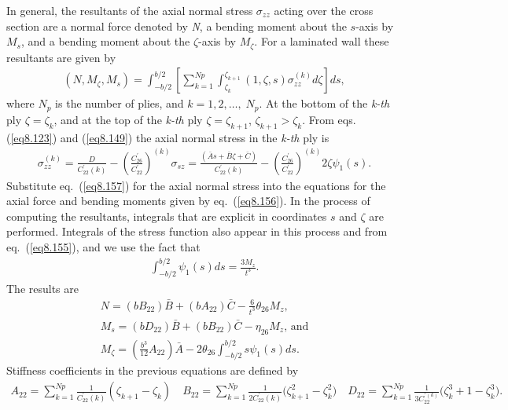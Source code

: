 \documentclass{AeroStructure-ERJohnson}
\begin{document}
In general, the resultants of the axial normal stress
$\sigma_{z z}$ acting over the cross section are a normal force
denoted by \textit{N}, a bending moment about the $s$-axis by
$M_{s}$, and a bending moment about the $\zeta$-axis by $M_{\zeta}$.
For a laminated wall these resultants are given by
\begin{align}\label{eq8.156}
\left(N, M_{\zeta}, M_{s}\right)=\int_{-b/ 2}^{b/
2}\left[\sum_{k=1}^{N p} \int^{\zeta_{k+1}}_{\zeta_{k}}(1, \zeta,
s) \sigma_{z z}^{(k)} d \zeta\right] d s,
\end{align}
where $N_{p}$ is the number of plies, and $k=1,2, \ldots,\; N_{p}$.
At the bottom of the \textit{k-th} ply $\zeta=\zeta_{k}$, and at
the top of the \textit{k-th} ply $\zeta=\zeta_{k+1}$,
$\zeta_{k+1}>\zeta_{k}$. From eqs. (\ref{eq8.123}) and
(\ref{eq8.149}) the axial normal stress in the \textit{k-th} ply
is
\begin{align}\label{eq8.157}
\sigma_{z
z}^{(k)}=\frac{D}{C_{22}^{\prime}(k)}-\left(\frac{C_{26}^{\prime}}{C_{22}^{\prime}}\right)^{(k)}
\sigma_{s z}=\frac{(\bar{A} s+\bar{B}
\zeta+\bar{C})}{C_{22}^{\prime}(k)}-\left(\frac{C_{26}^{\prime}}{C_{22}^{\prime}}\right)^{(k)}
2 \zeta \psi_{1}(s).
\end{align}
Substitute eq.~(\ref{eq8.157}) for the axial normal stress into
the equations for the axial force and bending moments given by
eq.~(\ref{eq8.156}). In the process of computing the resultants,
integrals that are explicit in coordinates $s$ and $\zeta$ are
performed. Integrals of the stress function also appear in this
process and from eq.~(\ref{eq8.155}), and we use the fact that
\begin{align*}
\int_{-b/ 2}^{b/ 2} \psi_{1}(s) d s=\frac{3 M_{z}}{t^{3}}.
\end{align*}
The results are
\begin{gather}
N=\left(b B_{22}\right) \bar{B}+\left(b A_{22}\right)
\bar{C}-\frac{6}{t^{3}} \theta_{26} M_{z},\label{eq8.158}\\
M_{s}=\left(b D_{22}\right) \bar{B}+\left(b B_{22}\right)
\bar{C}-\eta_{26} M_{z}\mbox{, and}\label{eq8.159}\\
M_{\zeta}=\left(\frac{b^{3}}{12} A_{22}\right) \bar{A}-2
\theta_{26} \int_{-b/ 2}^{b/ 2} s \psi_{1}(s) d s.\label{eq8.160}
\end{gather}
Stiffness coefficients in the previous equations are defined by
\begin{align}\label{eq8.161}
A_{22}=\sum_{k=1}^{Np}
\frac{1}{C_{22}^{\prime}(k)}\left(\zeta_{k+1}-\zeta_{k}\right)
\quad B_{22}=\sum_{k=1}^{Np} \frac{1}{2
C_{22}^{\prime}(k)}\big(\zeta_{k+1}^{2}-\zeta_{k}^{2}\big)
\quad D_{22}=\sum_{k=1}^{Np} \frac{1}{3 C^{\prime(k)}_{22}}\big(\zeta_{k}^{3}+1-\zeta_{k}^{3}\big).
\end{align}
\end{document}
